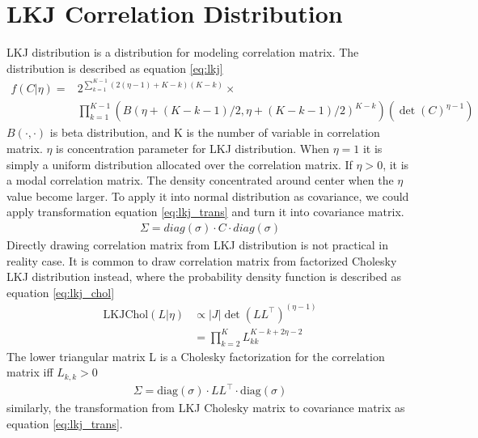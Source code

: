 \section{LKJ Correlation Distribution} \label{ch2:lkj}
LKJ distribution \cite{lewandowski_generating_2009} is a distribution for modeling correlation matrix. The distribution is described as equation \ref{eq:lkj}
\begin{align} \label{eq:lkj}
f(C|\eta)=&2^{\sum_{k=1}^{K-1}(2(\eta-1)+K-k)(K-k)}\times\\
&\prod_{k=1}^{K-1}(B(\eta+(K-k-1)/2,\eta+(K-k-1)/2)^{K-k})(\det(C)^{\eta-1})
\end{align}
$ B(\cdot,\cdot) $ is beta distribution, and K is the number of variable in correlation matrix. $ \eta $ is concentration parameter for LKJ distribution. When $ \eta=1 $ it is simply a uniform distribution allocated over the correlation matrix. If $ \eta>0 $, it is a modal correlation matrix. The density concentrated around center when the $ \eta $ value become larger.
To apply it into normal distribution as covariance, we could apply transformation equation \ref{eq:lkj_trans} and turn it into covariance matrix\cite{barnard_modeling_2000}.
\begin{align}\label{eq:lkj_trans}
\Sigma=diag(\sigma)\cdot C \cdot diag(\sigma)
\end{align}
Directly drawing correlation matrix from LKJ distribution is not practical in reality case. It is common to draw correlation matrix from factorized Cholesky LKJ distribution instead, where the probability density function is described as equation \ref{eq:lkj_chol}
\begin{align} \label{eq:lkj_chol}
\text{LKJChol}(L|\eta)&\propto|J|\det(LL^\top)^{(\eta-1)}\\
&=\prod_{k=2}^{K}L_{kk}^{K-k+2\eta-2}
\end{align}
The lower triangular matrix L is a Cholesky factorization for the correlation matrix iff $ L_{k,k}>0 $
\begin{align}
\Sigma=\text{diag}(\sigma)\cdot LL^\top \cdot \text{diag}(\sigma)
\end{align}
similarly, the transformation from LKJ Cholesky matrix to covariance matrix as equation \ref{eq:lkj_trans}.
